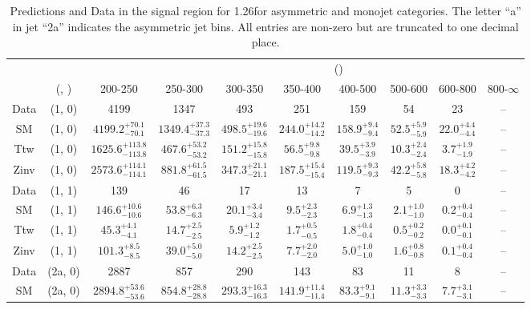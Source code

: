 \begin{table}[h!]
\tiny
\centering
\caption{Predictions and Data in the signal region for 1.26\ifb for asymmetric and monojet categories. The letter ``a'' in jet \eg ``2a''  indicates the asymmetric jet bins. All entries are non-zero but are truncated to one decimal place.\label{tab:yieldsallpost_sig_comb_asym}}
\begin{tabular}
{cccccccccc}
	\hline\hline
&	&	& \multicolumn{8}{c}{\scalht (\gev)}\\ 
	&	 (\njet, \nb) & 200-250 & 250-300 & 300-350 & 350-400 & 400-500 & 500-600 & 600-800 & 800-$\infty$ \\ [0.8ex] 
\hline
	Data & (1, 0) & 4199 & 1347 & 493 & 251 & 159 & 54 & 23 & -- \\[0.5ex] 
	SM & (1, 0) & $4199.2^{+ 70.1 }_{- 70.1 }$ & $1349.4^{+ 37.3 }_{- 37.3 }$ & $498.5^{+ 19.6 }_{- 19.6 }$ & $244.0^{+ 14.2 }_{- 14.2 }$ & $158.9^{+ 9.4 }_{- 9.4 }$ & $52.5^{+ 5.9 }_{- 5.9 }$ & $22.0^{+ 4.4 }_{- 4.4 }$ & -- \\[0.5ex] 
	Ttw & (1, 0) & $1625.6^{+ 113.8 }_{- 113.8 }$ & $467.6^{+ 53.2 }_{- 53.2 }$ & $151.2^{+ 15.8 }_{- 15.8 }$ & $56.5^{+ 9.8 }_{- 9.8 }$ & $39.5^{+ 3.9 }_{- 3.9 }$ & $10.3^{+ 2.4 }_{- 2.4 }$ & $3.7^{+ 1.9 }_{- 1.9 }$ & -- \\[0.5ex] 
	Zinv & (1, 0) & $2573.6^{+ 114.1 }_{- 114.1 }$ & $881.8^{+ 61.5 }_{- 61.5 }$ & $347.3^{+ 21.1 }_{- 21.1 }$ & $187.5^{+ 15.4 }_{- 15.4 }$ & $119.5^{+ 9.3 }_{- 9.3 }$ & $42.2^{+ 5.8 }_{- 5.8 }$ & $18.3^{+ 4.2 }_{- 4.2 }$ & -- \\[0.5ex] 
	Data & (1, 1) & 139 & 46 & 17 & 13 & 7 & 5 & 0 & -- \\[0.5ex] 
	SM & (1, 1) & $146.6^{+ 10.6 }_{- 10.6 }$ & $53.8^{+ 6.3 }_{- 6.3 }$ & $20.1^{+ 3.4 }_{- 3.4 }$ & $9.5^{+ 2.3 }_{- 2.3 }$ & $6.9^{+ 1.3 }_{- 1.3 }$ & $2.1^{+ 1.0 }_{- 1.0 }$ & $0.2^{+ 0.4 }_{- 0.4 }$ & -- \\[0.5ex] 
	Ttw & (1, 1) & $45.3^{+ 4.1 }_{- 4.1 }$ & $14.7^{+ 2.5 }_{- 2.5 }$ & $5.9^{+ 1.2 }_{- 1.2 }$ & $1.7^{+ 0.5 }_{- 0.5 }$ & $1.8^{+ 0.4 }_{- 0.4 }$ & $0.5^{+ 0.2 }_{- 0.2 }$ & $0.0^{+ 0.1 }_{- 0.1 }$ & -- \\[0.5ex] 
	Zinv & (1, 1) & $101.3^{+ 8.5 }_{- 8.5 }$ & $39.0^{+ 5.0 }_{- 5.0 }$ & $14.2^{+ 2.5 }_{- 2.5 }$ & $7.7^{+ 2.0 }_{- 2.0 }$ & $5.0^{+ 1.0 }_{- 1.0 }$ & $1.6^{+ 0.8 }_{- 0.8 }$ & $0.1^{+ 0.4 }_{- 0.4 }$ & -- \\[0.5ex] 
	Data & (2a, 0) & 2887 & 857 & 290 & 143 & 83 & 11 & 8 & -- \\[0.5ex] 
	SM & (2a, 0) & $2894.8^{+ 53.6 }_{- 53.6 }$ & $854.8^{+ 28.8 }_{- 28.8 }$ & $293.3^{+ 16.3 }_{- 16.3 }$ & $141.9^{+ 11.4 }_{- 11.4 }$ & $83.3^{+ 9.1 }_{- 9.1 }$ & $11.3^{+ 3.3 }_{- 3.3 }$ & $7.7^{+ 3.1 }_{- 3.1 }$ & -- \\[0.5ex] 

\end{tabular}
\end{table}
